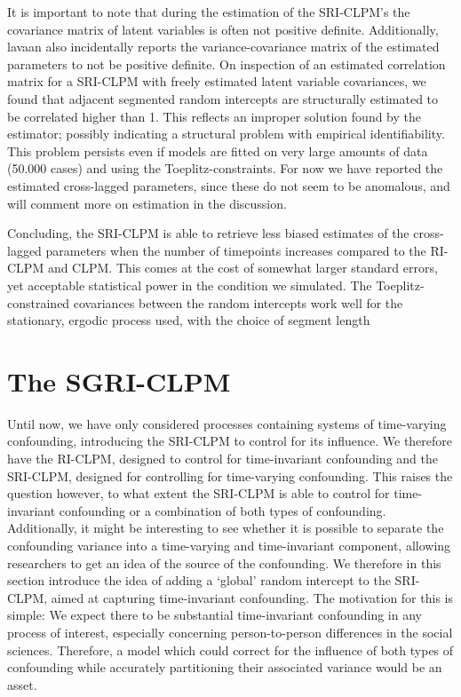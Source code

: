 \documentclass[
  man,
  floatsintext,
  longtable,
  nolmodern,
  notxfonts,
  notimes,
  colorlinks=true,linkcolor=blue,citecolor=blue,urlcolor=blue]{apa7}
\begin{document}
It is important to note that during the estimation of the SRI-CLPM's the
covariance matrix of latent variables is often not positive definite.
Additionally, lavaan also incidentally reports the variance-covariance
matrix of the estimated parameters to not be positive definite. On
inspection of an estimated correlation matrix for a SRI-CLPM with freely
estimated latent variable covariances, we found that adjacent segmented
random intercepts are structurally estimated to be correlated higher
than 1. This reflects an improper solution found by the estimator;
possibly indicating a structural problem with empirical identifiability.
This problem persists even if models are fitted on very large amounts of
data (50.000 cases) and using the Toeplitz-constraints. For now we have
reported the estimated cross-lagged parameters, since these do not seem
to be anomalous, and will comment more on estimation in the discussion.

Concluding, the SRI-CLPM is able to retrieve less biased estimates of
the cross-lagged parameters when the number of timepoints increases
compared to the RI-CLPM and CLPM. This comes at the cost of somewhat
larger standard errors, yet acceptable statistical power in the
condition we simulated. The Toeplitz-constrained covariances between the
random intercepts work well for the stationary, ergodic process used,
with the choice of segment length

\section{The SGRI-CLPM}\label{the-sgri-clpm}

Until now, we have only considered processes containing systems of
time-varying confounding, introducing the SRI-CLPM to control for its
influence. We therefore have the RI-CLPM, designed to control for
time-invariant confounding and the SRI-CLPM, designed for controlling
for time-varying confounding. This raises the question however, to what
extent the SRI-CLPM is able to control for time-invariant confounding or
a combination of both types of confounding. Additionally, it might be
interesting to see whether it is possible to separate the confounding
variance into a time-varying and time-invariant component, allowing
researchers to get an idea of the source of the confounding. We
therefore in this section introduce the idea of adding a `global' random
intercept to the SRI-CLPM, aimed at capturing time-invariant
confounding. The motivation for this is simple: We expect there to be
substantial time-invariant confounding in any process of interest,
especially concerning person-to-person differences in the social
sciences. Therefore, a model which could correct for the influence of
both types of confounding while accurately partitioning their associated
variance would be an asset.
\end{document}
